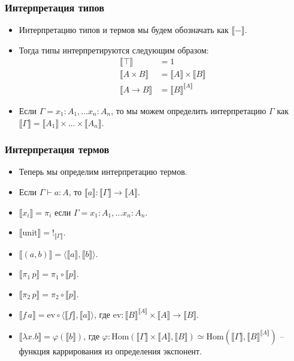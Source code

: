 \documentclass{beamer}
\theoremstyle{definition}
\renewcommand{\ll}{\llbracket}
\newcommand{\rr}{\rrbracket}
\newcommand{\fs}[1]{\mathrm{#1}}
\newcommand{\ev}{\mathrm{ev}}
\newcommand{\fst}{\pi_1}
\newcommand{\snd}{\pi_2}
\newcommand{\unit}{\mathrm{unit}}
\begin{document}
\begin{frame}
\frametitle{Интерпретация типов}
\begin{itemize}
\item Интерпретацию типов и термов мы будем обозначать как $\ll - \rr$.
\item Тогда типы интерпретируются следующим образом:
\begin{align*}
\ll \top \rr & = 1 \\
\ll A \times B \rr & = \ll A \rr \times \ll B \rr \\
\ll A \to B \rr & = \ll B \rr^{\ll A \rr}
\end{align*}
\item Если $\Gamma = x_1 : A_1, \ldots x_n : A_n$, то мы можем определить интерпретацию $\Gamma$ как $\ll \Gamma \rr = \ll A_1 \rr \times \ldots \times \ll A_n \rr$.
\end{itemize}
\end{frame}

\begin{frame}
\frametitle{Интерпретация термов}
\begin{itemize}
\item Теперь мы определим интерпретацию термов.
\item Если $\Gamma \vdash a : A$, то $\ll a \rr : \ll \Gamma \rr \to \ll A \rr$.
\item $\ll x_i \rr = \pi_i$ если $\Gamma = x_1 : A_1, \ldots x_n : A_n$.
\item $\ll \unit \rr = !_{\ll \Gamma \rr}$.
\item $\ll (a,b) \rr = \langle \ll a \rr, \ll b \rr \rangle$.
\item $\ll \fst\,p \rr = \pi_1 \circ \ll p \rr$.
\item $\ll \snd\,p \rr = \pi_2 \circ \ll p \rr$.
\item $\ll f\,a \rr = \ev \circ \langle \ll f \rr, \ll a \rr \rangle$, где $\ev : \ll B \rr^{\ll A \rr} \times \ll A \rr \to \ll B \rr$.
\item $\ll \lambda x. b \rr = \varphi(\ll b \rr)$, где $\varphi : \fs{Hom}(\ll \Gamma \rr \times \ll A \rr, \ll B \rr) \simeq \fs{Hom}(\ll \Gamma \rr, \ll B \rr^{\ll A \rr})$ -- функция каррирования из определения экспонент.
\end{itemize}
\end{frame}
\end{document}
